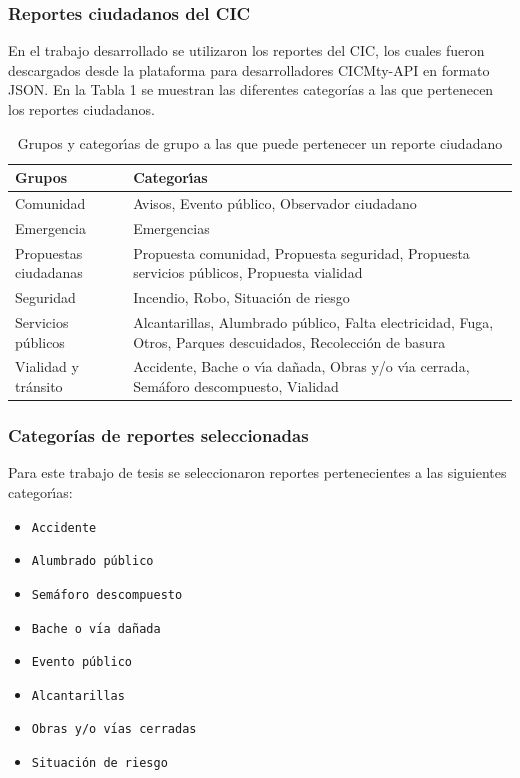 \documentclass{beamer}
\begin{document}
\begin{frame}
  \frametitle{Reportes ciudadanos del CIC}
      En el trabajo desarrollado se utilizaron los reportes del CIC, los cuales fueron descargados desde la plataforma para desarrolladores CICMty-API en formato JSON. En la Tabla 1 se muestran las diferentes categor\'{i}as a las que pertenecen los reportes ciudadanos.
  \begin{table}\scriptsize
    \centering
    \begin{tabular}{|l|p{6cm}|}
      \hline
      \textbf{Grupos}&\textbf{Categor\'{\i}as}\\
      \hline
      Comunidad&Avisos, Evento p\'{u}blico, Observador ciudadano\\
      \hline
      Emergencia&Emergencias\\
      \hline
      Propuestas ciudadanas&Propuesta comunidad, Propuesta seguridad, Propuesta servicios p\'{u}blicos, Propuesta vialidad\\
      \hline
      Seguridad&Incendio, Robo, Situaci\'{o}n de riesgo\\
      \hline
      Servicios p\'{u}blicos&Alcantarillas, Alumbrado p\'{u}blico, Falta electricidad, Fuga, Otros, Parques descuidados, Recolecci\'{o}n de basura\\
      \hline
      Vialidad y tr\'{a}nsito&Accidente, Bache o v\'{\i}a da\~{n}ada, Obras y/o v\'{\i}a cerrada, Sem\'{a}foro descompuesto, Vialidad\\
      \hline
    \end{tabular}
    \caption{Grupos y categor\'{\i}as de grupo a las que puede pertenecer un reporte ciudadano}
  \end{table}      
\end{frame}

\begin{frame}
  \frametitle{Categor\'{i}as de reportes seleccionadas}
  Para este trabajo de tesis se seleccionaron reportes pertenecientes a las siguientes categor\'{\i}as: 
  \begin{itemize}
    \item \texttt{Accidente}
    \item \texttt{Alumbrado p\'{u}blico}
    \item \texttt{Sem\'{a}foro descompuesto}
    \item \texttt{Bache o v\'{\i}a da\~{n}ada}
    \item \texttt{Evento p\'{u}blico}
    \item \texttt{Alcantarillas}
    \item \texttt{Obras y/o v\'{\i}as cerradas}
    \item \texttt{Situaci\'{o}n de riesgo}
  \end{itemize}
\end{frame}
\end{document}
